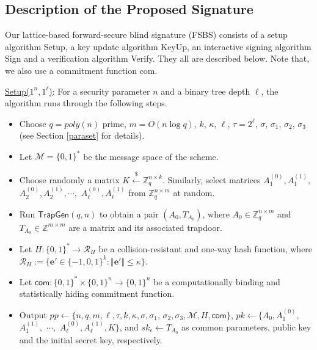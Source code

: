 \documentclass[runningheads]{llncs}
\def\ZZ{\mathbb{Z}}
\def\cal{\mathcal}
\def\bf{\mathbf}
\def\TrapGen{\mathsf{TrapGen}}
\begin{document}
\subsection{Description of the Proposed Signature}\label{forwardscheme}
Our lattice-based forward-secure blind signature (\textsf{FSBS}) consists of 
a setup algorithm \textsf{Setup}, a key update algorithm \textsf{KeyUp}, an interactive signing algorithm \textsf{Sign} 
and a verification algorithm \textsf{Verify}.  
They all are described below. Note that, we also use a commitment function \textsf{com}.

\begin{description}	 
\item \underline{\textsf{Setup}($1^n, 1^{\ell}$)}: 
	For a security parameter $n$ and a binary tree depth $\ell$, the algorithm runs through the following steps.
	\begin{itemize}
	\item Choose $q=poly(n)$ prime, $m=O(n\log q)$, $k$, $\kappa$, $\ell$, $\tau=2^\ell$, $\sigma$, $\sigma_1$, $\sigma_2$, $\sigma_3$ 
		(see Section \ref{paraset} for details).
	\item Let $\mathcal{M} = \{0,1\}^*$ be the message space of the scheme.
	\item Choose randomly a matrix  $K \xleftarrow{\$}\mathbb{Z}_q^{n\times k}$. Similarly, select 
		matrices $A_1^{(0)}, A_1^{(1)}, $ $A_2^{(0)}, A_2^{(1)}, \cdots,$ $ A_{\ell}^{(0)}, A_{\ell}^{(1)}$  from $\mathbb{Z}_q^{n\times m}$
		at random.
	\item Run $\TrapGen(q,n)$ to obtain a pair $(A_0, T_{A_0})$, 
		where $A_0 \in \ZZ_q^{n\times m}$ and $T_{A_0}\in\ZZ^{m\times m}$ are a matrix and its associated trapdoor.  
	\item Let $H: \{0,1\}^* \rightarrow \cal{R}_H$ be a collision-resistant and one-way hash function, where $\cal{R}_H:=\{\bf{e}' \in \{-1,0,1\}^k: \Vert \bf{e}' \Vert \leq \kappa \}$.
	\item Let $\mathsf{com}: \{0,1\}^* \times \{0,1\}^n \rightarrow \{0,1\}^n$ be a computationally binding and statistically hiding commitment function.
	\item Output $pp\leftarrow\{n,q, m,\ell,\tau, k, \kappa,\sigma, \sigma_1$, $\sigma_2, \sigma_3, \mathcal{M}, H, \textsf{com}\}$, $pk \leftarrow \{A_0, A_1^{(0)},$ $ A_1^{(1)},$ $ \cdots,$ $ A_\ell^{(0)}, A_\ell^{(1)}, K\}$, and $sk_{\epsilon} \leftarrow T_{A_0}$ as common parameters, public key and the initial secret key, respectively.
	\end{itemize} 

\end{description}
\end{document}
